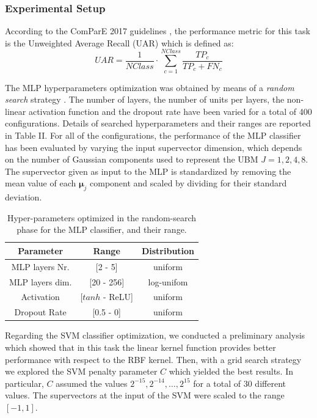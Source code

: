 \subsubsection{Experimental Setup}
According to the ComParE 2017 guidelines \cite{ComParE2017}, the performance metric for this task is the Unweighted Average Recall (UAR) which is defined as:
\begin{equation}
UAR= \frac{1}{NClass} \cdot \sum_{c=1}^{NClass}\frac{TP_c}{TP_c+FN_c}
\end{equation}

The MLP hyperparameters optimization was obtained by means of a \textit{random search} strategy  \cite{bergstra2012}.  The number of layers, the number of units per layers, the non-linear activation function and the dropout rate have been varied for a total of 400 configurations. Details of searched hyperparameters and their ranges are reported in Table II. For all of the configurations, the performance of the MLP classifier has been evaluated by varying the input supervector dimension, which depends on the number of Gaussian components used to represent the UBM $J={1,2,4,8}$. The supervector given as input to the MLP is standardized by removing the mean value of each $\boldsymbol{\mu}_j$ component and scaled by dividing for their standard deviation. 
\begin{table}[h]
	
	\centering
	\begin{tabular} {|c | c | c|}
		\hline
		Parameter & Range & Distribution\\  
		\hline
		\hline                                     
		MLP layers Nr.  & [2 - 5]& uniform \\
		\hline                                     
		MLP layers dim. & [20 - 256]& log-unifom \\
		\hline                                     
		Activation & [$tanh$ - ReLU] & uniform\\
		\hline
		Dropout Rate & [0.5 - 0] & uniform \\
		\hline
	\end{tabular}		
	\caption[VOTE Classification - Experiments]{Hyper-parameters optimized in the random-search phase for the MLP classifier, and their range.}
	\label{tab:randomsearch}
\end{table}

Regarding the SVM classifier optimization, we conducted a preliminary analysis which showed that in this task the linear kernel function provides better performance with respect to the RBF kernel.
Then, with a grid search strategy  we explored the SVM penalty parameter $C$ which yielded the best results. In particular, $C$ assumed the values $2^{-15}, 2^{-14},\ldots,2^{15}$ for a total of 30 different values. The supervectors at the input of the SVM were scaled to the range $[-1,1]$.

